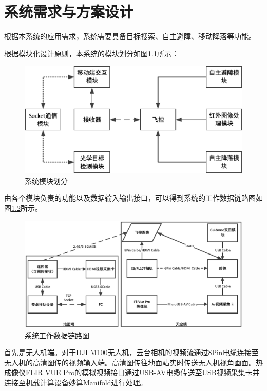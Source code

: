 \chapter{系统需求与方案设计}
\thispagestyle{fancy}
根据本系统的应用需求，系统需要具备目标搜索、自主避障、移动降落等功能。

根据模块化设计原则，本系统的模块划分如图\ref{系统模块划分}所示：

\begin{figure}[h]
    \centering
    \includegraphics[width=14cm]{figures/系统模块划分.pdf}
    \caption{系统模块划分}\label{系统模块划分}
\end{figure}

由各个模块负责的功能以及数据输入输出接口，可以得到系统的工作数据链路图如图\ref{系统工作数据链路图}所示。

\begin{figure}[h]
    \centering
    \includegraphics[width=14cm]{figures/系统工作数据链路图.pdf}
    \caption{系统工作数据链路图}\label{系统工作数据链路图}
\end{figure}

首先是无人机端。对于DJI M100无人机，云台相机的视频流通过8Pin电缆连接至无人机的高清图传的视频输入端。高清图传往地面站实时传送无人机视角画面。热成像仪FLIR VUE Pro的模拟视频接口通过USB-AV电缆传送至USB视频采集卡并连接至机载计算设备妙算Manifold进行处理。


